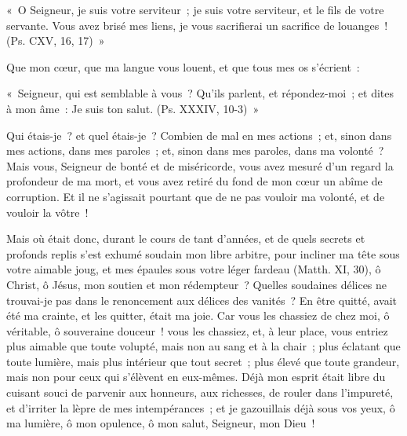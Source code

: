 \documentclass[french,twoside]{book} %
\newenvironment{quoteblock}%
  {\begin{quoting}}
  {\end{quoting}}
\newenvironment{quotebar}{%
    \def\FrameCommand{{\color{rubric!10!}\vrule width 0.5em} \hspace{0.9em}}%
    \def\OuterFrameSep{\itemsep} %
    \MakeFramed {\advance\hsize-\width \FrameRestore}
  }%
  {%
    \endMakeFramed
  }
\renewenvironment{quoteblock}%
  {%
    \savenotes
    \setstretch{0.9}
    \normalfont
    \begin{quotebar}
  }
  {%
    \end{quotebar}
    \spewnotes
  }
\begin{document}
\begin{quoteblock}
\noindent « O Seigneur, je suis votre serviteur ; je suis votre serviteur, et le fils de votre servante. Vous avez brisé mes liens, je vous sacrifierai un sacrifice de louanges ! (Ps. CXV, 16, 17) »\end{quoteblock}

\noindent Que mon cœur, que ma langue vous louent, et que tous mes os s’écrient :\par

\begin{quoteblock}
\noindent « Seigneur, qui est semblable à vous ? Qu’ils parlent, et répondez-moi ; et dites à mon âme : Je suis ton salut. (Ps. XXXIV, 10-3) »\end{quoteblock}

\noindent Qui étais-je ? et quel étais-je ? Combien de mal en mes actions ; et, sinon dans mes actions, dans mes paroles ; et, sinon dans mes paroles, dans ma volonté ? Mais vous, Seigneur de bonté et de miséricorde, vous avez mesuré d’un regard la profondeur de ma mort, et vous avez retiré du fond de mon cœur un abîme de corruption. Et il ne s’agissait pourtant que de ne pas vouloir ma volonté, et de vouloir la vôtre !\par
Mais où était donc, durant le cours de tant d’années, et de quels secrets et profonds replis s’est exhumé soudain mon libre arbitre, pour incliner ma tête sous votre aimable joug, et mes épaules sous votre léger fardeau (Matth. XI, 30), ô Christ, ô Jésus, mon soutien et mon rédempteur ? Quelles soudaines délices ne trouvai-je pas dans le renoncement aux délices des vanités ? En être quitté, avait été ma crainte, et les quitter, était ma joie. Car vous les chassiez de chez moi, ô véritable, ô souveraine douceur ! vous les chassiez, et, à leur place, vous entriez plus aimable que toute volupté, mais non au sang et à la chair ; plus éclatant que toute lumière, mais plus intérieur que tout secret ; plus élevé que toute grandeur, mais non pour ceux qui s’élèvent en eux-mêmes. Déjà mon esprit était libre du cuisant souci de parvenir aux honneurs, aux richesses, de rouler dans l’impureté, et d’irriter la lèpre de mes intempérances ; et je gazouillais déjà sous vos yeux, ô ma lumière, ô mon opulence, ô mon salut, Seigneur, mon Dieu !
\end{document}
